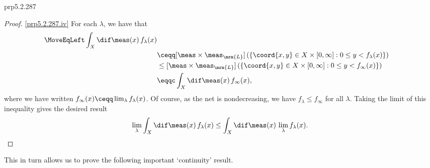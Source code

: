 \begin{thm}{}{prp5.2.287}
\begin{proof}
\blankline
\noindent
\cref{prp5.2.287.iv} For each $\lambda$, we have that
\begin{equation*}
\begin{split}
\MoveEqLeft
\int _X\dif \meas (x)\, f_{\lambda}(x) \\
& \ceqq [\meas \times \meas _{\mrm{L}}]\left( \left\{ \coord{x,y}\in X\times [0,\infty ]:0\leq y<f_{\lambda}(x)\right\} \right) \\
& \leq [\meas \times \meas _{\mrm{L}}]\left( \left\{ \coord{x,y}\in X\times [0,\infty ]:0\leq y<f_{\infty}(x)\right\} \right) \\
& \eqqc \int _X\dif \meas (x)\, f_{\infty}(x),
\end{split}
\end{equation*}
where we have written $f_{\infty}(x)\ceqq \lim _{\lambda}f_{\lambda}(x)$.  Of course, as the net is nondecreasing, we have $f_{\lambda}\leq f_{\infty}$ for all $\lambda$.  Taking the limit of this inequality gives the desired result
\begin{equation}
\lim _{\lambda}\int _X\dif \meas (x)\, f_{\lambda}(x)\leq \int _X\dif \meas (x)\, \lim _{\lambda}f_{\lambda}(x).
\end{equation}
\end{proof}
\end{thm}
This in turn allows us to prove the following important `continuity' result.
